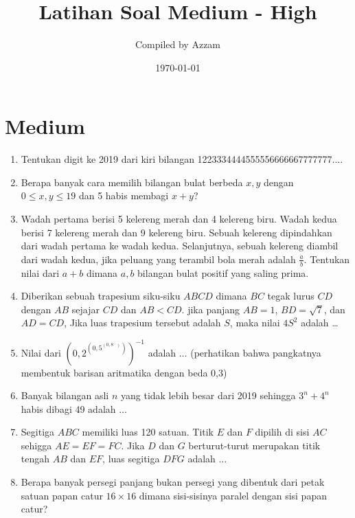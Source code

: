 \documentclass[11pt]{scrartcl}
\begin{document}
	\title{Latihan Soal Medium - High} %
	\date{\today}
	\author{Compiled by Azzam}
	\maketitle
	\section{Medium}
	\begin{enumerate}
		\item
		Tentukan digit ke 2019 dari kiri bilangan 1223334444555556666667777777....
		
		\item
		Berapa banyak cara memilih bilangan bulat berbeda $x, y$ dengan $0 \le x, y \le 19$ dan 5 habis membagi $x + y$?
		
		\item
		Wadah pertama berisi 5 kelereng merah dan 4 kelereng biru. Wadah kedua berisi 7 kelereng merah dan
		9 kelereng biru. Sebuah kelereng dipindahkan dari wadah pertama ke wadah kedua. Selanjutnya, sebuah
		kelereng diambil dari wadah kedua, jika peluang yang terambil bola merah adalah
		$\frac{a}{b}$. Tentukan nilai dari $a+b$ dimana $a, b$ bilangan bulat positif yang saling prima.
		
		\item
		Diberikan sebuah trapesium siku-siku $ABCD$ dimana $BC$ tegak lurus $CD$ dengan $AB$ sejajar $CD$ dan $AB < CD$. jika panjang $AB = 1$, $BD = \sqrt{7}$, dan $AD = CD$, Jika luas trapesium tersebut adalah $S$, maka nilai $4S^2$ adalah \dots
		
		\item Nilai dari $\left(0,2 ^{\left(0,5 ^{\left(0,8 ^{...} \right)} \right)} \right)^{-1}$ adalah $\dots$ (perhatikan bahwa pangkatnya membentuk barisan aritmatika dengan beda 0,3)
		
		\item Banyak bilangan asli $n$ yang tidak lebih besar dari 2019 sehingga $3^n+4^n$ habis dibagi 49 adalah $\dots$
		
		\item Segitiga $ABC$ memiliki luas 120 satuan. Titik $E$ dan $F$ dipilih di sisi $AC$ sehigga $AE=EF=FC$. Jika $D$ dan $G$ berturut-turut merupakan titik tengah $AB$ dan $EF$, luas segitiga $DFG$ adalah $\dots$
		
		\item
		Berapa banyak persegi panjang bukan persegi yang dibentuk dari petak satuan papan catur $16 \times 16$ dimana sisi-sisinya paralel dengan sisi papan catur?


\end{enumerate}
\end{document}
